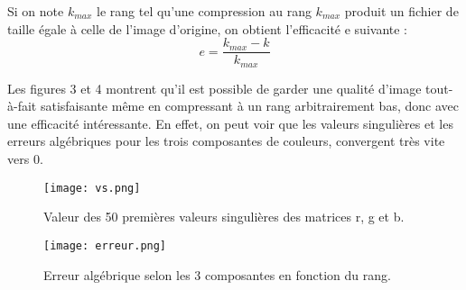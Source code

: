 \documentclass{article}
\begin{document}
\vspace{5mm}

Si on note $k_{max}$ le rang tel qu'une compression au rang $k_{max}$ produit un fichier de taille égale à celle de l'image d'origine, on obtient l'efficacité e suivante :
$$e = \frac{k_{max} - k}{k_{max}}$$

\vspace{5mm}

Les figures 3 et 4 montrent qu'il est possible de garder une qualité d'image tout-à-fait satisfaisante même en compressant à un rang arbitrairement bas, donc avec une efficacité intéressante. En effet, on peut voir que les valeurs singulières et les erreurs algébriques pour les trois composantes de couleurs, convergent très vite vers 0.
\begin{figure}[h]
	\caption{Valeur des 50 premières valeurs singulières des matrices r, g et b.}
	\texttt{[image: vs.png]}
\end{figure}

\begin{figure}[h]
	\caption{Erreur algébrique selon les 3 composantes en fonction du rang.}
	\texttt{[image: erreur.png]}
\end{figure}
\end{document}
